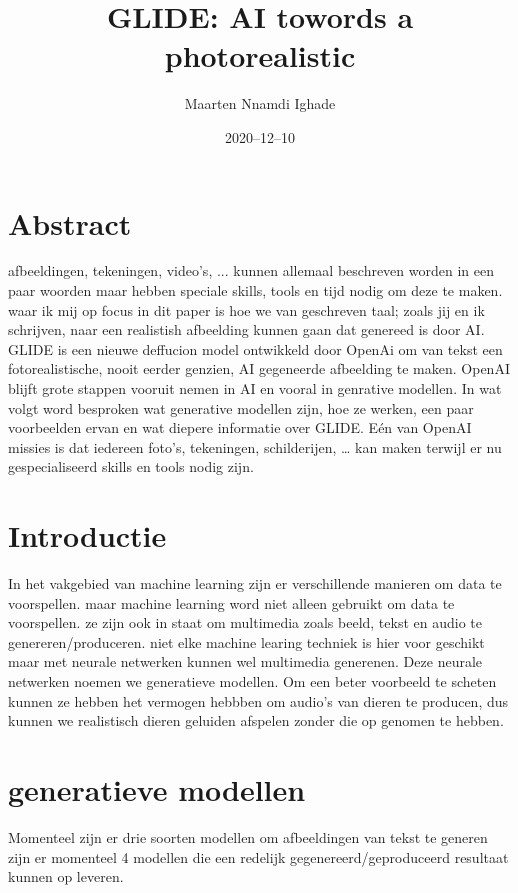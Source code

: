 \documentclass[12pt]{article}
\title{GLIDE: AI towords a photorealistic}
\author{Maarten Nnamdi Ighade}
\date{2020–12–10}
\begin{document}
\maketitle


\section{Abstract}
afbeeldingen, tekeningen, video's, ... kunnen allemaal beschreven worden in een paar woorden
maar hebben speciale skills, tools en tijd nodig om deze te maken. 
waar ik mij op focus in dit paper is hoe we van geschreven taal; zoals jij en ik schrijven, naar een realistish afbeelding kunnen gaan dat genereed is door AI.
GLIDE is een nieuwe deffucion model ontwikkeld door OpenAi om van tekst een fotorealistische, nooit eerder genzien, AI gegeneerde afbeelding te maken.
OpenAI blijft grote stappen vooruit nemen in AI en vooral in genrative modellen. In wat volgt word besproken wat generative modellen zijn, hoe ze werken, een paar voorbeelden ervan en wat diepere informatie over GLIDE. 
Eén van OpenAI missies is dat iedereen foto’s, tekeningen, schilderijen, … kan maken terwijl er nu gespecialiseerd skills en tools nodig zijn. 




\section{Introductie}

In het vakgebied van machine learning zijn er verschillende manieren om data te voorspellen.
maar machine learning word niet alleen gebruikt om data te voorspellen. ze zijn ook in staat om multimedia zoals beeld, tekst en audio te genereren/produceren.
niet elke machine learing techniek is hier voor geschikt maar met neurale netwerken kunnen wel multimedia generenen.
Deze neurale netwerken noemen we generatieve modellen. Om een beter voorbeeld te scheten kunnen
ze hebben het vermogen hebbben om audio’s van dieren te producen,
dus kunnen we realistisch dieren geluiden afspelen zonder die op genomen te hebben.


\section{generatieve modellen}

Momenteel zijn er drie soorten modellen om afbeeldingen van tekst te generen zijn er momenteel 4 modellen die een redelijk gegenereerd/geproduceerd
resultaat kunnen op leveren. 
\end{document}
